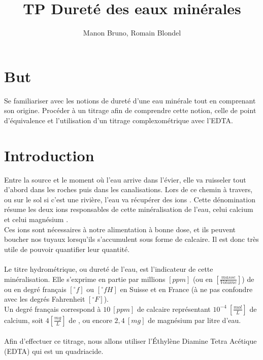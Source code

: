 \documentclass[11pt]{article}
\title{\textbf{TP Dureté des eaux minérales}}
\author{Manon Bruno, Romain Blondel}
\affil{2M8, Gymnase Auguste Piccard}
\begin{document}
\maketitle

\section{But}
Se familiariser avec les notions de dureté d'une eau minérale tout en comprenant son origine. Procéder à un titrage afin de comprendre cette notion, celle de point d'équivalence et l'utilisation d'un titrage complexométrique avec l'EDTA.

\section{Introduction}
\label{sec:intro}

Entre la source et le moment où l'eau arrive dans l'évier, elle va ruisseler tout d'abord dans les roches puis dans les canalisations. Lors de ce chemin à travers, ou sur le sol si c'est une rivière, l'eau va récupérer des ions . Cette dénomination résume les deux ions responsables de cette minéralisation de l'eau, celui calcium  et celui magnésium .\\
Ces ions sont nécessaires à notre alimentation à bonne dose, et ils peuvent boucher nos tuyaux lorsqu'ils s'accumulent sous forme de calcaire. Il est donc très utile de pouvoir quantifier leur quantité. \\ \\
Le titre hydrométrique, ou dureté de l'eau, est l'indicateur de cette minéralisation. Elle s'exprime en partie par millions $[ppm]$ (ou en $[\frac{masse}{Volume}]$) de  ou en degré français $[^\circ f]$ ou $[^\circ fH]$ en Suisse et en France (à ne pas confondre avec les degrés Fahrenheit $[^\circ F]$).\\
Un degré français correspond à $10 \ [ppm]$ de calcaire représentant $10^{-4} \ [\frac{mol}{L}]$ de calcium, soit $4 [\frac{mg}{L}]$ de , ou encore $2,4 \ [mg]$ de magnésium par litre d'eau. \\ \\
Afin d'effectuer ce titrage, nous allons utiliser l’Éthylène Diamine Tetra Acétique (EDTA) qui est un quadriacide.
\end{document}
